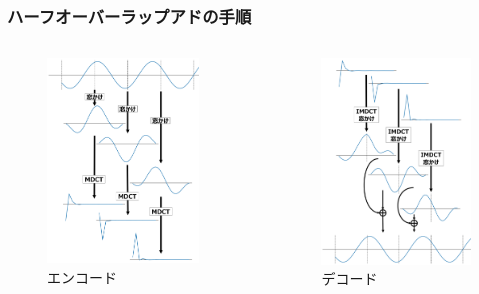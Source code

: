 \documentclass[14pt,xcolor=dvipsnames,table,dvipdfmx]{beamer}
\begin{document}
\begin{frame}[c]
    \frametitle{ハーフオーバーラップアドの手順}
    \vspace*{-25pt}
    \begin{columns}
        \begin{column}{0.5\textwidth}
            \vspace*{12pt}
            \begin{figure}
                \includegraphics[width=58mm]{./figs/halft_overlap_add_encode.png}
                \caption*{エンコード}
            \end{figure}
        \end{column}
        \begin{column}{.01\textwidth}
            \vspace*{60pt}
        \end{column}
        \hspace{-10pt}
        \begin{column}{0.5\textwidth}
            \vspace*{12pt}
            \begin{figure}
                \includegraphics[width=57mm]{./figs/halft_overlap_add_decode.png}
                \caption*{デコード}
            \end{figure}
        \end{column}
    \end{columns}
\end{frame}
\end{document}
